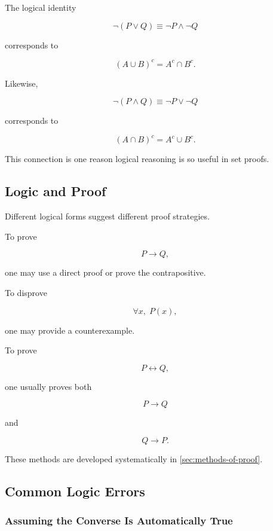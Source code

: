 The logical identity

\[ \neg(P\lor Q)\equiv\neg P\land\neg Q \]

corresponds to

\[ (A\cup B)^c=A^c\cap B^c. \]

Likewise,

\[ \neg(P\land Q)\equiv\neg P\lor\neg Q \]

corresponds to

\[ (A\cap B)^c=A^c\cup B^c. \]

This connection is one reason logical reasoning is so useful in set proofs.

\subsection{Logic and Proof}
\label{subsec:logic-and-proof}

Different logical forms suggest different proof strategies.

To prove

\[ P\to Q, \]

one may use a direct proof or prove the contrapositive.

To disprove

\[ \forall x,\;P(x), \]

one may provide a counterexample.

To prove

\[ P\leftrightarrow Q, \]

one usually proves both

\[ P\to Q \]

and

\[ Q\to P. \]

These methods are developed systematically in
\cref{sec:methods-of-proof}.

\subsection{Common Logic Errors}
\label{subsec:common-logic-errors}

\subsubsection{Assuming the Converse Is Automatically True}

